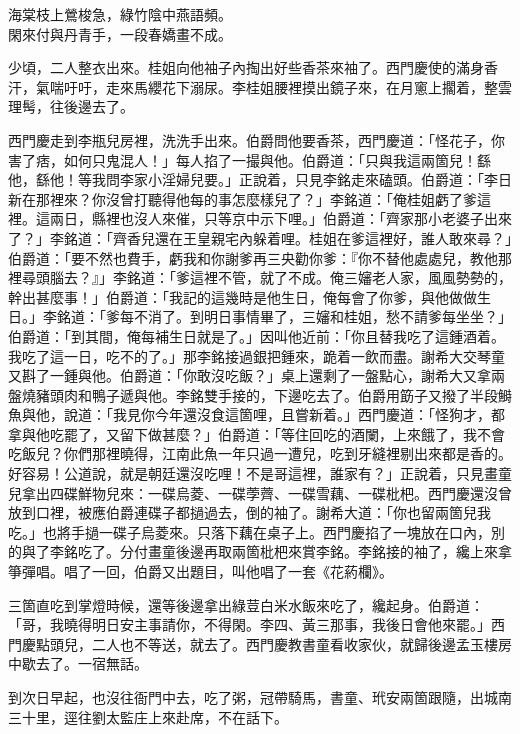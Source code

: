 \begin{myquote}
海棠枝上鶯梭急，綠竹陰中燕語頻。\\閑來付與丹青手，一段春嬌畫不成。
\end{myquote}

少頃，二人整衣出來。桂姐向他袖子內掏出好些香茶來袖了。西門慶使的滿身香汗，氣喘吁吁，走來馬纓花下溺尿。李桂姐腰裡摸出鏡子來，{}在月窻上擱着，整雲理髩，往後邊去了。

西門慶走到李瓶兒房裡，洗洗手出來。伯爵問他要香茶，西門慶道：「怪花子，你害了痞，如何只鬼混人！」每人掐了一撮與他。伯爵道：「只與我這兩箇兒！繇他，繇他！等我問李家小淫婦兒要。」正說着，只見李銘走來磕頭。伯爵道：「李日新在那裡來？你沒曾打聽得他每的事怎麼樣兒了？」李銘道：「俺桂姐虧了爹這裡。這兩日，縣裡也沒人來催，只等京中示下哩。」伯爵道：「齊家那小老婆子出來了？」李銘道：「齊香兒還在王皇親宅內躲着哩。桂姐在爹這裡好，誰人敢來尋？」伯爵道：「要不然也費手，虧我和你謝爹再三央勸你爹：『你不替他處處兒，教他那裡尋頭腦去？』」李銘道：「爹這裡不管，就了不成。俺三嬸老人家，風風勢勢的，幹出甚麼事！」伯爵道：「我記的這幾時是他生日，{}俺每會了你爹，與他做做生日。」{}李銘道：「爹每不消了。到明日事情畢了，三嬸和桂姐，愁不請爹每坐坐？」伯爵道：「到其間，俺每補生日就是了。」{}因叫他近前：「你且替我吃了這鍾酒着。我吃了這一日，吃不的了。」那李銘接過銀把鍾來，跪着一飲而盡。謝希大交琴童又斟了一鍾與他。伯爵道：「你敢沒吃飯？」桌上還剩了一盤點心，謝希大又拿兩盤燒豬頭肉和鴨子遞與他。李銘雙手接的，下邊吃去了。伯爵用筯子又撥了半段鰣魚與他，說道：「我見你今年還沒食這箇哩，且嘗新着。」西門慶道：「怪狗才，都拿與他吃罷了，又留下做甚麼？」伯爵道：「等住回吃的酒闌，上來餓了，我不會吃飯兒？你們那裡曉得，江南此魚一年只過一遭兒，吃到牙縫裡剔出來都是香的。好容易！公道說，就是朝廷還沒吃哩！不是哥這裡，誰家有？」{}正說着，只見畫童兒拿出四碟鮮物兒來：一碟烏菱、一碟荸薺、一碟雪藕、一碟枇杷。西門慶還沒曾放到口裡，被應伯爵連碟子都撾過去，倒的袖了。謝希大道：「你也留兩箇兒我吃。」也將手撾一碟子烏菱來。只落下藕在桌子上。西門慶掐了一塊放在口內，別的與了李銘吃了。分付畫童後邊再取兩箇枇杷來賞李銘。李銘接的袖了，纔上來拿箏彈唱。唱了一回，伯爵又出題目，叫他唱了一套《花葯欄》。

三箇直吃到掌燈時候，還等後邊拿出綠荳白米水飯來吃了，纔起身。伯爵道：「哥，我曉得明日安主事請你，不得閑。李四、黃三那事，我後日會他來罷。」{}西門慶點頭兒，二人也不等送，就去了。西門慶教書童看收家伙，就歸後邊孟玉樓房中歇去了。一宿無話。

到次日早起，也沒往衙門中去，吃了粥，冠帶騎馬，書童、玳安兩箇跟隨，出城南三十里，逕往劉太監庄上來赴席，不在話下。

